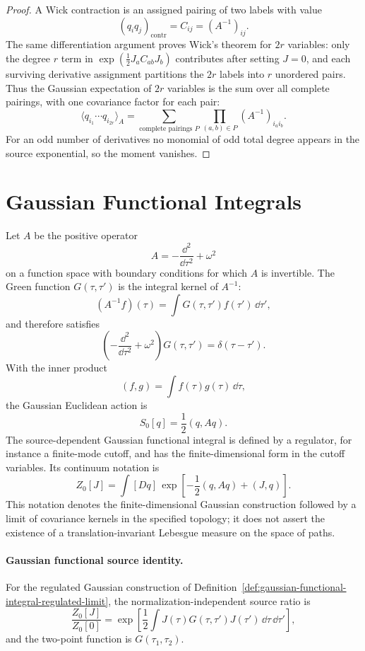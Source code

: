 \begin{proof}
A Wick contraction is an assigned pairing of two labels with value
\[
  (q_iq_j)_{\mathrm{contr}}=C_{ij}=(A^{-1})_{ij}.
\]
The same differentiation argument proves Wick's theorem for \(2r\) variables:
only the degree \(r\) term in
\(\exp(\frac12J_aC_{ab}J_b)\) contributes after setting \(J=0\), and each
surviving derivative assignment partitions the \(2r\) labels into \(r\)
unordered pairs.  Thus the Gaussian expectation of \(2r\) variables is the
sum over all complete pairings, with one covariance factor for each pair:
\[
  \langle q_{i_1}\cdots q_{i_{2r}}\rangle_A
  =
  \sum_{\text{complete pairings }P}
  \prod_{(a,b)\in P}(A^{-1})_{i_ai_b}.
\]
For an odd number of derivatives no monomial of odd total degree appears in
the source exponential, so the moment vanishes.
\end{proof}

\section{Gaussian Functional Integrals}

\begin{definition}
\label{def:gaussian-functional-integral-regulated-limit}
Let \(A\) be the positive operator
\[
  A=-\frac{\dd^2}{\dd\tau^2}+\omega^2
\]
on a function space with boundary conditions for which \(A\) is invertible.
The Green function \(G(\tau,\tau')\) is the integral kernel of \(A^{-1}\):
\[
  (A^{-1}f)(\tau)
  =
  \int G(\tau,\tau')f(\tau')\,\dd\tau',
\]
and therefore satisfies
\[
  \left(
    -\frac{\dd^2}{\dd\tau^2}+\omega^2
  \right)G(\tau,\tau')
  =
  \delta(\tau-\tau').
\]
With the inner product
\[
  (f,g)=\int f(\tau)g(\tau)\,\dd\tau,
\]
the Gaussian Euclidean action is
\[
  S_0[q]=\frac12(q,Aq).
\]
The source-dependent Gaussian functional integral is defined by a regulator,
for instance a finite-mode cutoff, and has the finite-dimensional form in the
cutoff variables. Its continuum notation is
\[
  Z_0[J]
  =
  \int[Dq]\,
  \exp\left[
    -\frac12(q,Aq)+(J,q)
  \right].
\]
This notation denotes the finite-dimensional Gaussian construction followed
by a limit of covariance kernels in the specified topology; it does not
assert the existence of a translation-invariant Lebesgue measure on the space
of paths.
\end{definition}

\paragraph{Gaussian functional source identity.}
For the regulated Gaussian construction of
Definition~\ref{def:gaussian-functional-integral-regulated-limit},
the normalization-independent source ratio is
\[
  \frac{Z_0[J]}{Z_0[0]}
  =
  \exp\left[
    \frac12\int J(\tau)G(\tau,\tau')J(\tau')\,
    \dd\tau\,\dd\tau'
  \right],
\]
and the two-point function is \(G(\tau_1,\tau_2)\).

